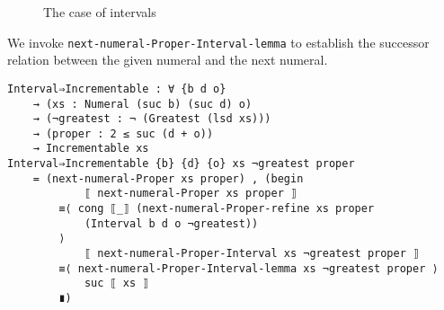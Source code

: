 \documentclass[\main/thesis.tex]{subfiles}
\begin{document}
\begin{figure}[H]
    \centering
        \begin{adjustbox}{max width=\textwidth}
    \end{adjustbox}
\caption{The case of intervals}
\label{figure:27}
\end{figure}

We invoke \lstinline|next-numeral-Proper-Interval-lemma| to establish the
successor relation between the given numeral and the next numeral.


\begin{lstlisting}[basicstyle=\ttfamily\scriptsize]
Interval⇒Incrementable : ∀ {b d o}
    → (xs : Numeral (suc b) (suc d) o)
    → (¬greatest : ¬ (Greatest (lsd xs)))
    → (proper : 2 ≤ suc (d + o))
    → Incrementable xs
Interval⇒Incrementable {b} {d} {o} xs ¬greatest proper
    = (next-numeral-Proper xs proper) , (begin
            ⟦ next-numeral-Proper xs proper ⟧
        ≡⟨ cong ⟦_⟧ (next-numeral-Proper-refine xs proper
            (Interval b d o ¬greatest))
        ⟩
            ⟦ next-numeral-Proper-Interval xs ¬greatest proper ⟧
        ≡⟨ next-numeral-Proper-Interval-lemma xs ¬greatest proper ⟩
            suc ⟦ xs ⟧
        ∎)
\end{lstlisting}
\end{document}
